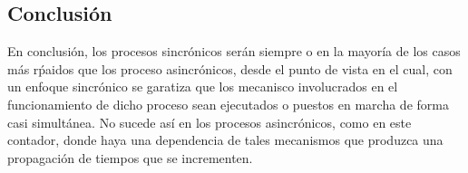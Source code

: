 \subsection{Conclusi\'on}
En conclusi\'on, los procesos sincr\'onicos ser\'an siempre o en la mayor\'ia de los casos m\'as r\'paidos que los proceso asincr\'onicos,
desde el punto de vista en el cual, con un enfoque sincr\'onico se garatiza que los mecanisco involucrados en el funcionamiento de dicho proceso
sean ejecutados o puestos en marcha de forma casi simult\'anea. No sucede as\'i en los procesos asincr\'onicos, como en este contador, donde haya 
una dependencia de tales mecanismos que produzca una propagaci\'on de tiempos que se incrementen.